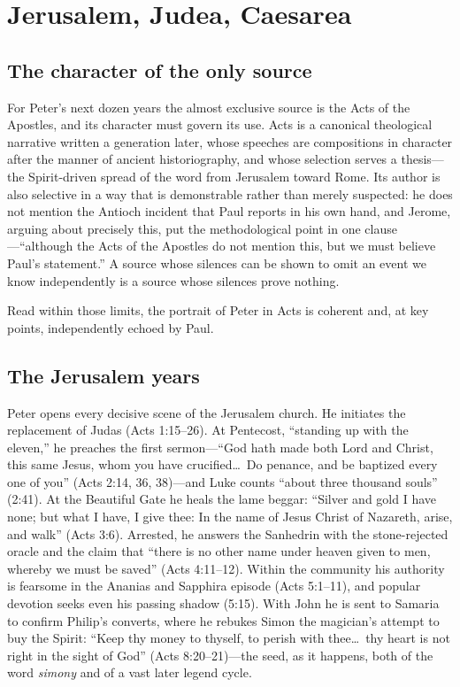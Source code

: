 \section{Jerusalem, Judea, Caesarea}

\subsection{The character of the only source}

For Peter's next dozen years the almost exclusive source is the Acts of the
Apostles, and its character must govern its use. Acts is a canonical
theological narrative written a generation later, whose speeches are
compositions in character after the manner of ancient historiography, and
whose selection serves a thesis---the Spirit-driven spread of the word from
Jerusalem toward Rome. Its author is also selective in a way that is
demonstrable rather than merely suspected: he does not mention the Antioch
incident that Paul reports in his own hand, and Jerome, arguing about
precisely this, put the methodological point in one clause---``although the
Acts of the Apostles do not mention this, but we must believe Paul's
statement.'' A source whose silences can be shown to omit an event we know
independently is a source whose silences prove nothing.

Read within those limits, the portrait of Peter in Acts is coherent and, at
key points, independently echoed by Paul.

\subsection{The Jerusalem years}

Peter opens every decisive scene of the Jerusalem church. He initiates the
replacement of Judas (Acts 1:15--26). At Pentecost, ``standing up with the
eleven,'' he preaches the first sermon---``God hath made both Lord and
Christ, this same Jesus, whom you have crucified\ldots\ Do penance, and be
baptized every one of you'' (Acts 2:14, 36, 38)---and Luke counts ``about
three thousand souls'' (2:41). At the Beautiful Gate he heals the lame
beggar: ``Silver and gold I have none; but what I have, I give thee: In the
name of Jesus Christ of Nazareth, arise, and walk'' (Acts 3:6). Arrested,
he answers the Sanhedrin with the stone-rejected oracle and the claim that
``there is no other name under heaven given to men, whereby we must be
saved'' (Acts 4:11--12). Within the community his authority is fearsome in
the Ananias and Sapphira episode (Acts 5:1--11), and popular devotion seeks
even his passing shadow (5:15). With John he is sent to Samaria to confirm
Philip's converts, where he rebukes Simon the magician's attempt to buy the
Spirit: ``Keep thy money to thyself, to perish with thee\ldots\ thy heart
is not right in the sight of God'' (Acts 8:20--21)---the seed, as it
happens, both of the word \emph{simony} and of a vast later legend cycle.

